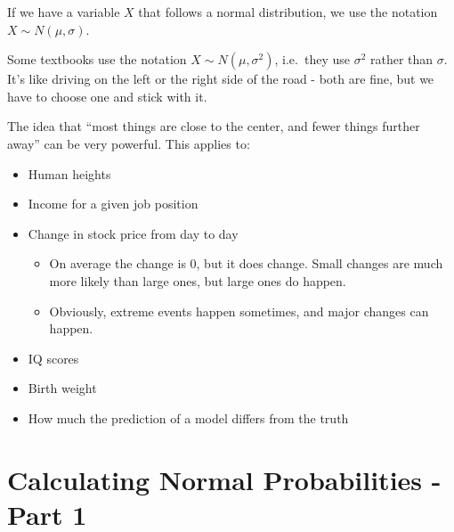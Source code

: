 \documentclass[
  letterpaper,
  DIV=11,
  numbers=noendperiod]{scrreprt}
\providecommand{\tightlist}{%
  \setlength{\itemsep}{0pt}\setlength{\parskip}{0pt}}\usepackage{longtable,booktabs,array}
\begin{document}
If we have a variable \(X\) that follows a normal distribution, we use
the notation \(X \sim N(\mu, \sigma)\).

\begin{tcolorbox}[enhanced jigsaw, opacitybacktitle=0.6, left=2mm, colbacktitle=quarto-callout-warning-color!10!white, colframe=quarto-callout-warning-color-frame, breakable, toptitle=1mm, title=\textcolor{quarto-callout-warning-color}{\faExclamationTriangle}\hspace{0.5em}{Warning}, opacityback=0, bottomrule=.15mm, toprule=.15mm, arc=.35mm, leftrule=.75mm, titlerule=0mm, bottomtitle=1mm, colback=white, rightrule=.15mm, coltitle=black]

Some textbooks use the notation \(X \sim N(\mu, \sigma^2)\), i.e.~they
use \(\sigma^2\) rather than \(\sigma\). It's like driving on the left
or the right side of the road - both are fine, but we have to choose one
and stick with it.

\end{tcolorbox}

The idea that ``most things are close to the center, and fewer things
further away'' can be very powerful. This applies to:

\begin{itemize}
\tightlist
\item
  Human heights
\item
  Income for a given job position
\item
  Change in stock price from day to day

  \begin{itemize}
  \tightlist
  \item
    On average the change is 0, but it does change. Small changes are
    much more likely than large ones, but large ones do happen.
  \item
    Obviously, extreme events happen sometimes, and major changes can
    happen.
  \end{itemize}
\item
  IQ scores
\item
  Birth weight
\item
  How much the prediction of a model differs from the truth
\end{itemize}

\hypertarget{calculating-normal-probabilities---part-1}{%
\chapter{Calculating Normal Probabilities - Part
1}\label{calculating-normal-probabilities---part-1}}
\end{document}
